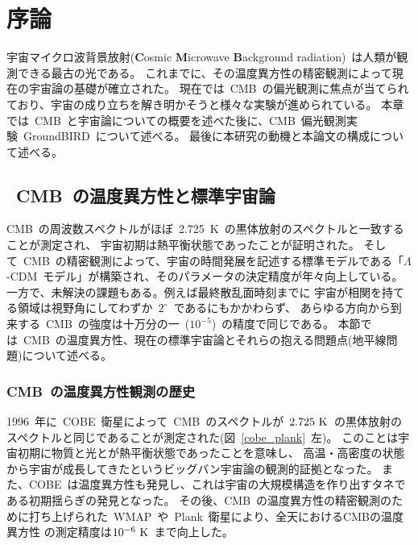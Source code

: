 \chapter{序論}

宇宙マイクロ波背景放射({\bf C}osmic {\bf M}icrowave {\bf B}ackground radiation)~は人類が観測できる最古の光である。
これまでに、その温度異方性の精密観測によって現在の宇宙論の基礎が確立された。
現在では~CMB~の偏光観測に焦点が当てられており、宇宙の成り立ちを解き明かそうと様々な実験が進められている。
本章では~CMB~と宇宙論についての概要を述べた後に、CMB~偏光観測実験~GroundBIRD~について述べる。
最後に本研究の動機と本論文の構成について述べる。

\section{~CMB~の温度異方性と標準宇宙論}
CMB~の周波数スペクトルがほぼ~2.725~K~の黒体放射のスペクトルと一致することが測定され\cite{cobe,cmb_discovery,cmb_discovery_theory}、
宇宙初期は熱平衡状態であったことが証明された。
そして~CMB~の精密観測によって、宇宙の時間発展を記述する標準モデルである「$\Lambda$-CDM~モデル」が構築され、そのパラメータの決定精度が年々向上している\cite{plank}。
一方で、未解決の課題もある。例えば最終散乱面時刻までに
宇宙が相関を持てる領域は視野角にしてわずか~$2^\circ$~であるにもかかわらず、
あらゆる方向から到来する~CMB~の強度は十万分の一~($10^{-5}$)~の精度で同じである。
本節では~CMB~の温度異方性、現在の標準宇宙論とそれらの抱える問題点(地平線問題)について述べる。


\subsection{CMB~の温度異方性観測の歴史}
1996~年に~COBE~衛星によって~CMB~のスペクトルが~$2.725~{\rm K}$~の黒体放射のスペクトルと同じであることが測定された(図~\ref{cobe_plank}~左)。
このことは宇宙初期に物質と光とが熱平衡状態であったことを意味し、
高温・高密度の状態から宇宙が成長してきたというビッグバン宇宙論の観測的証拠となった。
また、COBE~は温度異方性も発見し、これは宇宙の大規模構造を作り出すタネである初期揺らぎの発見となった。
その後、CMB~の温度異方性の精密観測のために打ち上げられた~WMAP~や~Plank~衛星により、全天におけるCMBの温度異方性
の測定精度は$10^{-6}~{\rm K}$~まで向上した。

